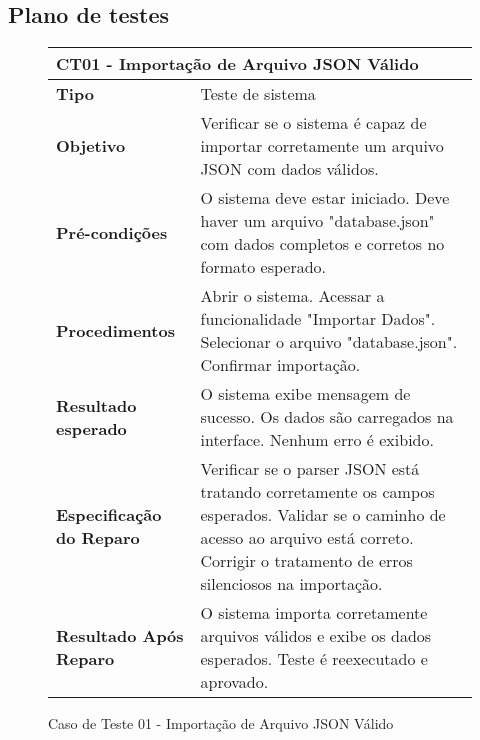 \subsection{Plano de testes}

\begin{figure}[H]
    \centering
\begin{longtable}{|p{}|p{}|}
\hline
\multicolumn{2}{|l|}{\textbf{CT01 - Importação de Arquivo JSON Válido}} \\
\hline
\textbf{Tipo} & Teste de sistema \\
\hline
\textbf{Objetivo} & Verificar se o sistema é capaz de importar corretamente um arquivo JSON com dados válidos. \\
\hline
\textbf{Pré-condições} & O sistema deve estar iniciado. Deve haver um arquivo "database.json" com dados completos e corretos no formato esperado.  \\
\hline
\textbf{Procedimentos} & Abrir o sistema. Acessar a funcionalidade "Importar Dados". Selecionar o arquivo "database.json". Confirmar importação. \\
\hline
\textbf{Resultado esperado} & O sistema exibe mensagem de sucesso. Os dados são carregados na interface. Nenhum erro é exibido. \\
\hline
\textbf{Especificação do Reparo} & Verificar se o parser JSON está tratando corretamente os campos esperados. Validar se o caminho de acesso ao arquivo está correto. Corrigir o tratamento de erros silenciosos na importação. \\
\hline
\textbf{Resultado Após Reparo} & O sistema importa corretamente arquivos válidos e exibe os dados esperados. Teste é reexecutado e aprovado. \\
\hline
\end{longtable}
\caption{Caso de Teste 01 - Importação de Arquivo JSON Válido}
\label{fig_ct01_importacao_json_valido}
\end{figure}

